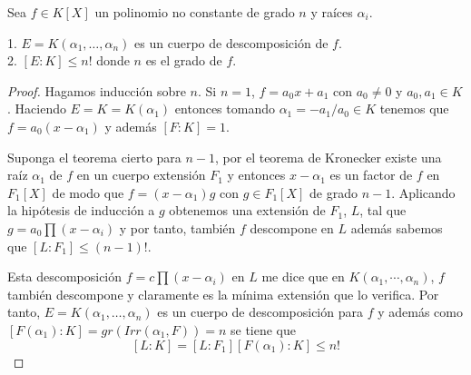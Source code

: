 \begin{proposition}
	Sea $f \in K[X]$ un polinomio no constante de grado $n$ y raíces $\alpha_i$. 
	
	1. $E = K(\alpha_1,\ldots,\alpha_n)$ es un cuerpo de descomposición de $f$. \\
	2. $[E:K] \le n!$ donde $n$ es el grado de $f$.
\end{proposition}
\begin{proof}
	Hagamos inducción sobre $n$. Si $n =  1$, $f = a_0x+a_1$ con $a_0 \neq 0$ y $a_0,a_1 \in K$. Haciendo $E = K = K(\alpha_1)$ entonces tomando $\alpha_1 = -a_1/a_0 \in K$ tenemos que $f = a_0(x-\alpha_1)$ y además $[F:K] = 1$. 
	
	Suponga el teorema cierto para $n-1$, por el teorema de Kronecker existe una raíz $\alpha_1$ de $f$ en un cuerpo extensión $F_1$ y entonces $x-\alpha_1$ es un factor de $f$ en $F_1[X]$ de modo que $f = (x-\alpha_1)g$ con $g \in F_1[X]$ de grado $n-1$. Aplicando la hipótesis de inducción a $g$ obtenemos una extensión de $F_1$, $L$, tal que $g = a_0 \prod (x - \alpha_i)$ y por tanto, también $f$ descompone en $L$ además sabemos que $[L:F_1] \le (n-1)!$. 
	
	Esta descomposición $f = c \prod (x - \alpha_i)$ en $L$ me dice que en $K(\alpha_1,\cdots,\alpha_n)$, $f$ también descompone y claramente es la mínima extensión que lo verifica. Por tanto, $E=K(\alpha_1,\ldots,\alpha_n)$ es un cuerpo de descomposición para $f$ y además como $[F(\alpha_1):K] = gr(Irr(\alpha_1,F)) = n$ se tiene que $$[L:K] = [L:F_1][F(\alpha_1):K] \le n!$$
\end{proof}

